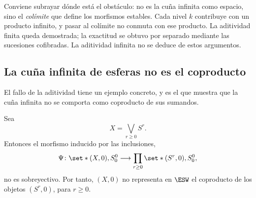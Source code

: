 \begin{nota}
   Conviene subrayar dónde está el obstáculo: no es la cuña infinita como espacio, sino el \emph{colímite} que define los morfismos estables. Cada nivel $k$ contribuye con un producto infinito, y pasar al colímite no conmuta con ese producto. La aditividad finita queda demostrada; la exactitud se obtuvo por separado mediante las sucesiones cofibradas. La aditividad infinita no se deduce de estos argumentos.
\end{nota}

\subsection{La cuña infinita de esferas no es el coproducto}

El fallo de la aditividad tiene un ejemplo concreto, y es el que muestra que la cuña infinita no se comporta como coproducto de sus sumandos.

\begin{ejem}\label{ejem:cuna}
Sea
\[
X=\bigvee_{r\ge0}S^r .
\]
Entonces el morfismo inducido por las inclusiones,
\[
\Psi\colon\set*{(X,0),S^0_0}\longrightarrow\prod_{r\ge0}\set*{(S^r,0),S^0_0},
\]
no es sobreyectivo. Por tanto, $(X,0)$ no representa en $\ESW$ el coproducto de los objetos $(S^r,0)$, para $r\geq0$.
\end{ejem}

